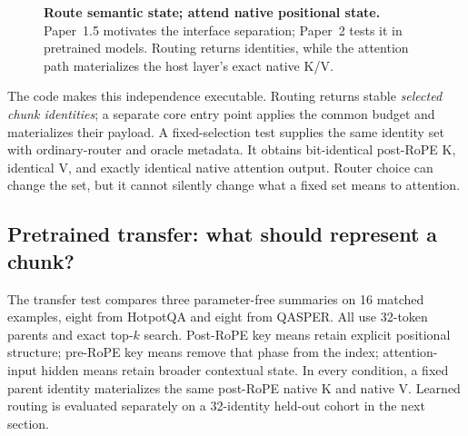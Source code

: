 \documentclass[11pt]{article}
\begin{document}
\begin{figure}[htbp]
\centering
{}
\caption{\textbf{Route semantic state; attend native positional state.} Paper~1.5 motivates the
interface separation; Paper~2 tests it in pretrained models. Routing returns identities, while
the attention path materializes the host layer's exact native K/V.}
\label{fig:routing-separation}
\end{figure}

The code makes this independence executable. Routing returns stable \emph{selected chunk
identities}; a separate core entry point applies the common budget and materializes their
payload. A fixed-selection test supplies the same identity set with ordinary-router and oracle
metadata. It obtains bit-identical post-RoPE K, identical V, and exactly identical native
attention output. Router choice can change the set, but it cannot silently change what a fixed
set means to attention.

\subsection{Pretrained transfer: what should represent a chunk?}

The transfer test compares three parameter-free summaries on 16 matched examples, eight from
HotpotQA and eight from QASPER. All use 32-token parents and exact top-$k$ search. Post-RoPE key
means retain explicit positional structure; pre-RoPE key means remove that phase from the index;
attention-input hidden means retain broader contextual state. In every condition, a fixed parent
identity materializes the same post-RoPE native K and native V. Learned routing is evaluated
separately on a 32-identity held-out cohort in the next section.
\end{document}
